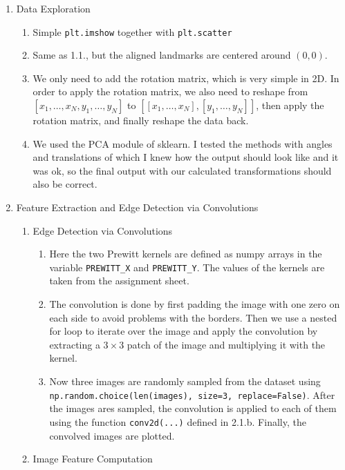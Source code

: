 \documentclass[
    a4paper,
    12pt,
    parskip=half,
]{scrarticle}
\begin{document}
\begin{enumerate}
    \item Data Exploration
    \begin{enumerate}[label=\theenumi.\arabic*.]
        \item Simple \texttt{plt.imshow} together with \texttt{plt.scatter}
        \item Same as 1.1., but the aligned landmarks are centered around \((0, 0)\).
        \item We only need to add the rotation matrix, which is very simple in 2D. In order to apply the rotation matrix,
        we also need to reshape from \([x_1, \ldots , x_N, y_1, \ldots, y_N]\) to \([[x_1, \ldots, x_N], [y_1, \ldots, y_N]]\), then apply
        the rotation matrix, and finally reshape the data back.
        \item We used the PCA module of sklearn.
        I tested the methods with angles and translations of which I knew how the output should look like and it was ok,
        so the final output with our calculated transformations should also be correct.
    \end{enumerate}

    \item Feature Extraction and Edge Detection via Convolutions
    \begin{enumerate}[label=\theenumi.\arabic*.]
        \item Edge Detection via Convolutions
        \begin{enumerate}[label=\alph*)]
            \item Here the two Prewitt kernels are defined as numpy arrays in the variable \texttt{PREWITT\_X} and \texttt{PREWITT\_Y}.
            The values of the kernels are taken from the assignment sheet.
            \item The convolution is done by first padding the image with one zero on each side to avoid problems with the borders.
            Then we use a nested for loop to iterate over the image and apply the convolution by extracting  a \(3 \times 3\) patch of the image and multiplying it with the kernel.
            \item Now three images are randomly sampled from the dataset using \\ \texttt{np.random.choice(len(images), size=3, replace=False)}.
            After the images ares sampled, the convolution is applied to each of them using the function \texttt{conv2d(...)} defined in 2.1.b.
            Finally, the convolved images are plotted.
        \end{enumerate}
        \item Image Feature Computation
    \end{enumerate}


\end{enumerate}
\end{document}
